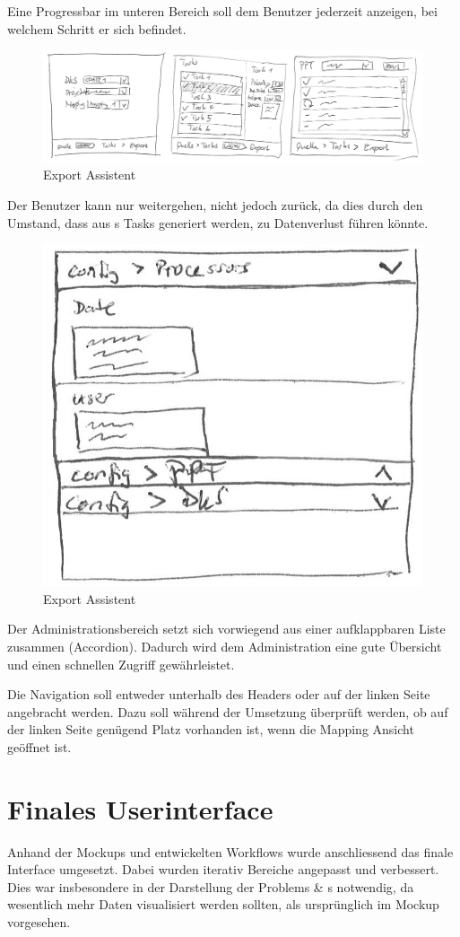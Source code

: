 		Eine Progressbar im unteren Bereich soll dem Benutzer jederzeit anzeigen, bei welchem Schritt er sich befindet.
		
		\begin{figure}[H]
			\includegraphics[width=\linewidth]{interfacesAndProtocols/media/img/exportWorkflow.jpg}
			\caption{Export Assistent}
			\label{fig:exportAssistent}
		\end{figure}	
		
		Der Benutzer kann nur weitergehen, nicht jedoch zurück, da dies durch den Umstand, 
		dass aus \ttpl s Tasks generiert werden, 
		zu Datenverlust führen könnte.
		
		\begin{figure}[H]
			\centering
			\includegraphics[width=0.3\linewidth]{interfacesAndProtocols/media/img/administration.jpg}
			\caption{Export Assistent}
			\label{fig:administration}
		\end{figure}	
		
		Der Administrationsbereich setzt sich vorwiegend aus einer aufklappbaren Liste zusammen (Accordion). Dadurch wird dem Administration eine gute Übersicht und einen schnellen Zugriff gewährleistet.
		
		Die Navigation soll entweder unterhalb des Headers oder auf der linken Seite angebracht werden. Dazu soll während der Umsetzung überprüft werden, ob auf der linken Seite genügend Platz vorhanden ist, wenn die Mapping Ansicht geöffnet ist.
		
		
	\section{Finales Userinterface}
	
		Anhand der Mockups und entwickelten Workflows wurde anschliessend das finale Interface umgesetzt.
		Dabei wurden iterativ Bereiche angepasst und verbessert.
		Dies war insbesondere in der Darstellung der Problems \& \ttpl s notwendig, 
		da wesentlich mehr Daten visualisiert werden sollten, als ursprünglich im Mockup vorgesehen.
		
